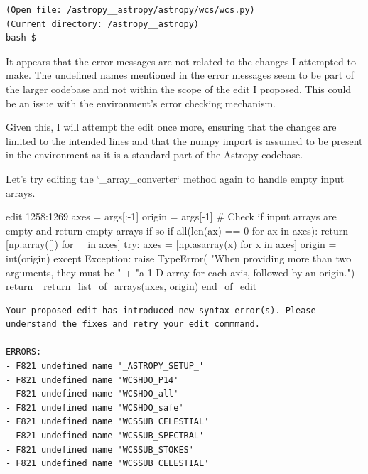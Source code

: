 {\begin{observationbox}
\begin{Verbatim}[breaklines=true, breakanywhere=true]
(Open file: /astropy__astropy/astropy/wcs/wcs.py)
(Current directory: /astropy__astropy)
bash-$
\end{Verbatim}
\end{observationbox}
\begin{agentbox}
It appears that the error messages are not related to the changes I attempted to make. The undefined names mentioned in the error messages seem to be part of the larger codebase and not within the scope of the edit I proposed. This could be an issue with the environment's error checking mechanism.



Given this, I will attempt the edit once more, ensuring that the changes are limited to the intended lines and that the numpy import is assumed to be present in the environment as it is a standard part of the Astropy codebase.



Let's try editing the `\_array\_converter` method again to handle empty input arrays.

\hrulefill
\begin{CodeVerbatim}[breaklines=true, breakanywhere=true]
edit 1258:1269
            axes = args[:-1]
            origin = args[-1]
            # Check if input arrays are empty and return empty arrays if so
            if all(len(ax) == 0 for ax in axes):
                return [np.array([]) for _ in axes]
            try:
                axes = [np.asarray(x) for x in axes]
                origin = int(origin)
            except Exception:
                raise TypeError(
                    "When providing more than two arguments, they must be " +
                    "a 1-D array for each axis, followed by an origin.")
            return _return_list_of_arrays(axes, origin)
end_of_edit
\end{CodeVerbatim}
\end{agentbox}
\begin{observationbox}\begin{Verbatim}[breaklines=true, breakanywhere=true]
Your proposed edit has introduced new syntax error(s). Please understand the fixes and retry your edit commmand.

ERRORS:
- F821 undefined name '_ASTROPY_SETUP_'
- F821 undefined name 'WCSHDO_P14'
- F821 undefined name 'WCSHDO_all'
- F821 undefined name 'WCSHDO_safe'
- F821 undefined name 'WCSSUB_CELESTIAL'
- F821 undefined name 'WCSSUB_SPECTRAL'
- F821 undefined name 'WCSSUB_STOKES'
- F821 undefined name 'WCSSUB_CELESTIAL'


\end{Verbatim}
\end{observationbox}}
